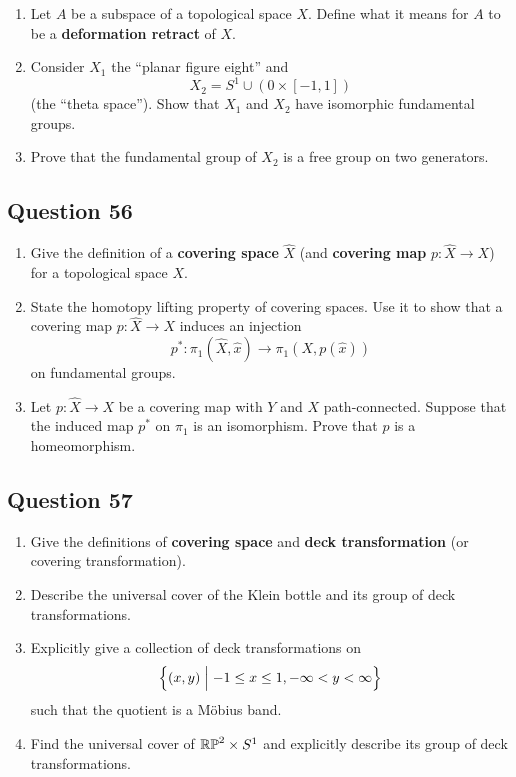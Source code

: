 \documentclass[12pt]{article}
\begin{document}
\begin{enumerate}
\def\labelenumi{\roman{enumi}.}
\item
  Let \(A\) be a subspace of a topological space \(X\). Define what it
  means for \(A\) to be a \textbf{deformation retract} of \(X\).
\item
  Consider \(X_1\) the ``planar figure eight'' and
  \[X_2 = S^1 \cup ({0} \times [-1, 1])\] (the ``theta space''). Show
  that \(X_1\) and \(X_2\) have isomorphic fundamental groups.
\item
  Prove that the fundamental group of \(X_2\) is a free group on two
  generators.
\end{enumerate}

\hypertarget{question-56-3}{%
\subsection{Question 56}\label{question-56-3}}

\begin{enumerate}
\def\labelenumi{\alph{enumi}.}
\item
  Give the definition of a \textbf{covering space} \(\hat{X}\) (and
  \textbf{covering map} \(p : \hat{X} \to X\)) for a topological space
  \(X\).
\item
  State the homotopy lifting property of covering spaces. Use it to show
  that a covering map \(p : \hat{X} \to X\) induces an injection \[
  p^\ast : \pi_1 (\hat{X}, \hat{x}) \to \pi_1 (X, p(\hat{x}))
  \] on fundamental groups.
\item
  Let \(p : \hat{X} \to X\) be a covering map with \(Y\) and \(X\)
  path-connected. Suppose that the induced map \(p^\ast\) on \(\pi_1\)
  is an isomorphism. Prove that \(p\) is a homeomorphism.
\end{enumerate}

\hypertarget{question-57-3}{%
\subsection{Question 57}\label{question-57-3}}

\begin{enumerate}
\def\labelenumi{\alph{enumi}.}
\item
  Give the definitions of \textbf{covering space} and \textbf{deck
  transformation} (or covering transformation).
\item
  Describe the universal cover of the Klein bottle and its group of deck
  transformations.
\item
  Explicitly give a collection of deck transformations on
  \[\left\{{(x, y) \mathrel{\Big|} -1 \leq x \leq 1, -\infty < y < \infty}\right\}\] such
  that the quotient is a Möbius band.
\item
  Find the universal cover of \({\mathbb{RP}}^2 \times S^1\) and explicitly
  describe its group of deck transformations.
\end{enumerate}
\end{document}
